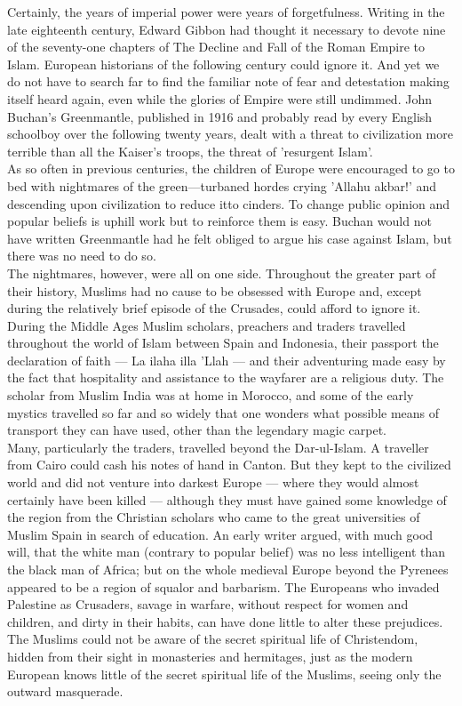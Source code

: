 \documentclass[11pt, b5paper, twoside]{book}
\begin{document}
Certainly, the years of imperial power were years of forgetfulness. Writing in the late eighteenth century, Edward Gibbon had thought it necessary to devote nine of the seventy-one chapters of The Decline and Fall of the Roman Empire to Islam. European historians of the following century could ignore it. And yet we do not have to search far to find the familiar note of fear and detestation making itself heard again, even while the glories of Empire were still undimmed. John Buchan's Greenmantle, published in 1916 and probably read by every English schoolboy over the following twenty years, dealt with a threat to civilization more terrible than all the Kaiser's troops, the threat of 'resurgent Islam'. \\

As so often in previous centuries, the children of Europe were encouraged to go to bed with nightmares of the green---turbaned hordes crying 'Allahu akbar!' and descending upon civilization to reduce itto cinders. To change public opinion and popular beliefs is uphill work but to reinforce them is easy. Buchan would not have written Greenmantle had he felt obliged to argue his case against Islam, but there was no need to do so. \\

The nightmares, however, were all on one side. Throughout the greater part of their history, Muslims had no cause to be obsessed with Europe and, except during the relatively brief episode of the Crusades, could afford to ignore it. During the Middle Ages Muslim scholars, preachers and traders travelled throughout the world of Islam between Spain and Indonesia, their passport the declaration of faith --- La ilaha illa 'Llah --- and their adventuring made easy by the fact that hospitality and assistance to the wayfarer are a religious duty. The scholar from Muslim India was at home in Morocco, and some of the early mystics travelled so far and so widely that one wonders what possible means of transport they can have used, other than the legendary magic carpet. \\

Many, particularly the traders, travelled beyond the Dar-ul-Islam. A traveller from Cairo could cash his notes of hand in Canton. But they kept to the civilized world and did not venture into darkest Europe --- where they would almost certainly have been killed --- although they must have gained some knowledge of the region from the Christian scholars who came to the great universities of Muslim Spain in search of education. An early writer argued, with much good will, that the white man (contrary to popular belief) was no less intelligent than the black man of Africa; but on the whole medieval Europe beyond the Pyrenees appeared to be a region of squalor and barbarism. The Europeans who invaded Palestine as Crusaders, savage in warfare, without respect for women and children, and dirty in their habits, can have done little to alter these prejudices. The Muslims could not be aware of the secret spiritual life of Christendom, hidden from their sight in monasteries and hermitages, just as the modern European knows little of the secret spiritual life of the Muslims, seeing only the outward masquerade. \\
\end{document}
